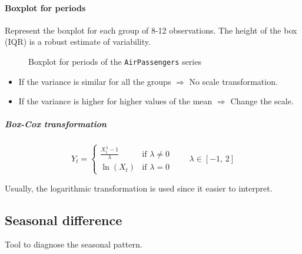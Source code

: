 \paragraph{Boxplot for periods} Represent the boxplot for each group of 8-12
observations. The height of the box (IQR) is a robust estimate of variability.

\begin{figure}[H]
	\caption{Boxplot for periods of the \texttt{AirPassengers} series}
\end{figure}

\begin{itemize}
    \item If the variance is similar for all the groups $\Longrightarrow$ No scale transformation.
    \item If the variance is higher for higher values of the mean $\Longrightarrow$ Change the scale.
\end{itemize}

\subparagraph{Box-Cox transformation}
\begin{equation}
    Y_t = \begin{cases}
        \frac{X_t^\lambda - 1}{\lambda} & \text{if } \lambda \neq 0 \\
        \ln(X_t) & \text{if } \lambda = 0
    \end{cases} \qquad \lambda \in [-1,\,2]
\end{equation}
\begin{marker}
    Usually, the logarithmic transformation is used since it easier to interpret.
\end{marker}

\subsection{Seasonal difference}
Tool to diagnose the seasonal pattern.

